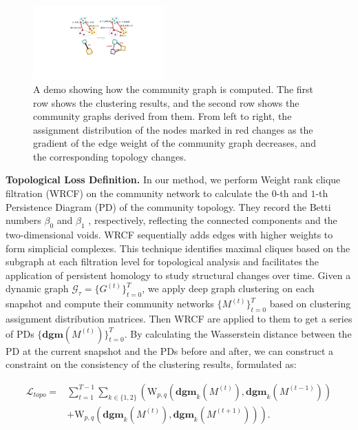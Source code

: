 \documentclass[letterpaper]{article} %
\begin{document}
\begin{figure}[] %
\centering %
\includegraphics[width=0.45\textwidth]{pic/comgraph.pdf} %
\caption{A demo showing how the community graph is computed. The first row shows the clustering results, and the second row shows the community graphs derived from them. From left to right, the assignment distribution of the nodes marked in red changes as the gradient of the edge weight of the community graph decreases, and the corresponding topology changes.} %
\label{Fig.comgraph} %
\end{figure}

\noindent\textbf{Topological Loss Definition.}
In our method, we perform Weight rank clique filtration (WRCF) \cite{petri2013topological} on the community network to calculate the \textit{$0$}-th and \textit{$1$}-th Persistence Diagram (PD) of the community topology. They record the Betti numbers $\beta_0$ and $\beta_1$ , respectively, reflecting the connected components and the two-dimensional voids. WRCF sequentially adds edges with higher weights to form simplicial complexes. This technique identifies maximal cliques based on the subgraph at each filtration level for topological analysis and facilitates the application of persistent homology to study structural changes over time. Given a dynamic graph  $\mathcal{G}_\tau=\{G^{(t)}\}_{t=0}^T$, we apply deep graph clustering on each snapshot and compute their community networks $\{M^{(t)}\}_{t=0}^T$ based on clustering assignment distribution matrices. Then WRCF are applied to them to get a series of PDs $\{\mathbf{dgm}(M^{(t)})\}_{t=0}^T$. By calculating the Wasserstein distance \cite{carriere2017sliced} between the PD at the current snapshot and the PDs before and after, we can construct a constraint on the consistency of the clustering results, formulated as:

\begin{equation}
\label{eq:loss topo}
    \begin{aligned}
        \mathcal{L}_{topo}  = 
        &\sum_{t=1}^{T-1} \sum_{k\in\{1,2\}}  \left( \mathrm{W}_{p, q}\left(\mathbf{dgm}_k(M^{(t)}),\mathbf{dgm}_k(M^{(t-1)})\right)\right.\\
        &\left.+\mathrm{W}_{p, q}\left(\mathbf{dgm}_k(M^{(t)}), \mathbf{dgm}_k(M^{(t+1)})\right) \right).\\
    \end{aligned}
\end{equation}
\end{document}
